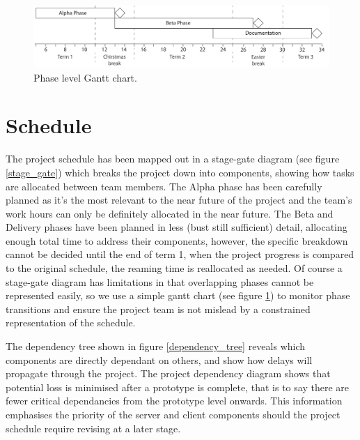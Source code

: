 \begin{figure}[h!]
	\label{gantt_chart}
	\includegraphics{res/gantt_chart_annotated}
	\caption{Phase level Gantt chart.}
\end{figure}


\section{Schedule}

The project schedule has been mapped out in a stage-gate diagram (see figure \ref{stage_gate}) which breaks the project down into components, showing how tasks are allocated between team members. The Alpha phase has been carefully planned as it's the most relevant to the near future of the project and the team's work hours can only be definitely allocated in the near future. The Beta and Delivery phases have been planned in less (bust still sufficient) detail, allocating enough total time to address their components, however, the specific breakdown cannot be decided until the end of term 1, when the project progress is compared to the original schedule, the reaming time is reallocated as needed. Of course a stage-gate diagram has limitations in that overlapping phases cannot be represented easily, so we use a simple gantt chart (see figure \ref{gantt_chart}) to monitor phase transitions and ensure the project team is not mislead by a constrained representation of the schedule. 

The dependency tree shown in figure \ref{dependency_tree} reveals which components are directly dependant on others, and show how delays will propagate through the project. The project dependency diagram shows that potential loss is minimised after a prototype is complete, that is to say there are fewer critical dependancies from the prototype level onwards. This information emphasises the priority of the server and client components should the project schedule require revising at a later stage.





